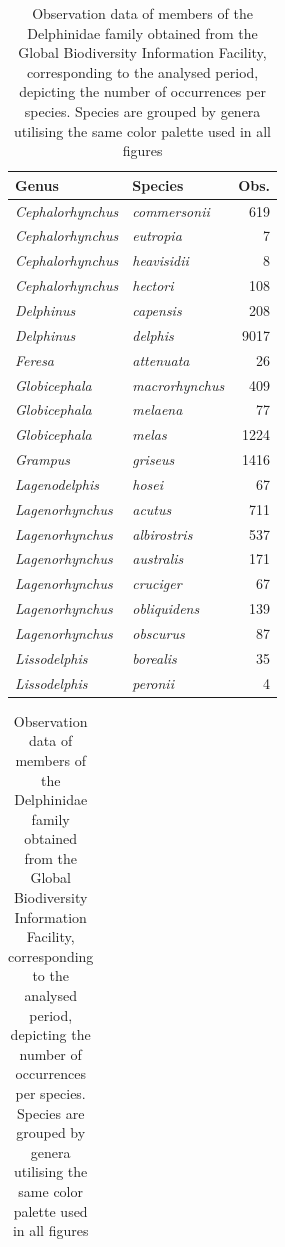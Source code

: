 \documentclass[10pt,letterpaper]{article}
\begin{document}
\begin{table}
\caption{\label{tab:unnamed-chunk-3}\label{table:species} Observation data of members of the Delphinidae family obtained from the Global Biodiversity Information Facility, corresponding to the analysed period, depicting the number of occurrences per species. Species are grouped by genera utilising the same color palette used in all figures}

\centering
\begin{tabular}{l|l|r}
\hline
Genus & Species & Obs.\\
\hline
\em{Cephalorhynchus} & \em{commersonii} & 619\\
\hline
\em{Cephalorhynchus} & \em{eutropia} & 7\\
\hline
\em{Cephalorhynchus} & \em{heavisidii} & 8\\
\hline
\em{Cephalorhynchus} & \em{hectori} & 108\\
\hline
\em{Delphinus} & \em{capensis} & 208\\
\hline
\em{Delphinus} & \em{delphis} & 9017\\
\hline
\em{Feresa} & \em{attenuata} & 26\\
\hline
\em{Globicephala} & \em{macrorhynchus} & 409\\
\hline
\em{Globicephala} & \em{melaena} & 77\\
\hline
\em{Globicephala} & \em{melas} & 1224\\
\hline
\em{Grampus} & \em{griseus} & 1416\\
\hline
\em{Lagenodelphis} & \em{hosei} & 67\\
\hline
\em{Lagenorhynchus} & \em{acutus} & 711\\
\hline
\em{Lagenorhynchus} & \em{albirostris} & 537\\
\hline
\em{Lagenorhynchus} & \em{australis} & 171\\
\hline
\em{Lagenorhynchus} & \em{cruciger} & 67\\
\hline
\em{Lagenorhynchus} & \em{obliquidens} & 139\\
\hline
\em{Lagenorhynchus} & \em{obscurus} & 87\\
\hline
\em{Lissodelphis} & \em{borealis} & 35\\
\hline
\em{Lissodelphis} & \em{peronii} & 4\\
\hline
\end{tabular}
\centering
\begin{tabular}{r}
\hline


\end{tabular}
\end{table}
\end{document}
